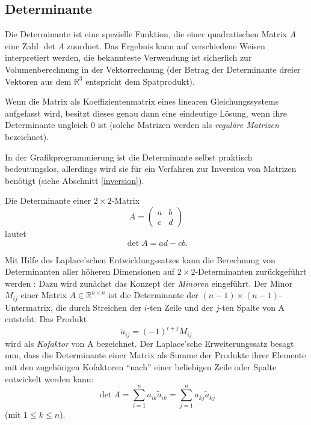 \subsection{Determinante}
Die Determinante ist eine spezielle Funktion, die einer quadratischen Matrix $A$ eine Zahl $\det A$ zuordnet. Das Ergebnis kann auf verschiedene Weisen interpretiert werden, die bekannteste Verwendung ist sicherlich zur Volumenberechnung in der Vektorrechnung (der Betrag der Determinante dreier Vektoren aus dem $\mathbb R^3$ entspricht dem Spatprodukt).

Wenn die Matrix als Koeffizientenmatrix eines linearen Gleichungssystems aufgefasst wird, besitzt dieses genau dann eine eindeutige Lösung, wenn ihre Determinante ungleich $0$ ist (solche Matrizen werden als \emph{reguläre Matrizen} bezeichnet). 

In der Grafikprogrammierung ist die Determinante selbst praktisch bedeutungslos, allerdings wird sie für ein Verfahren zur Inversion von Matrizen benötigt (siehe Abschnitt \ref{inversion}).

Die Determinante einer $2 \times 2$-Matrix
\begin{equation*}
 A = \begin{pmatrix}
      a & b \\
      c & d
     \end{pmatrix}
\end{equation*}
lautet
\begin{equation}
 \det A = ad - cb.
\end{equation}

Mit Hilfe des Laplace'schen Entwicklungssatzes kann die Berechnung von Determinanten aller höheren Dimensionen auf $2 \times 2$-Determinanten zurückgeführt werden : Dazu wird zunächst das Konzept der \emph{Minoren} eingeführt. Der Minor $M_{ij}$ einer Matrix $A \in \mathbb{R}^{n \times n}$ ist die Determinante der $(n-1) \times (n-1)$-Untermatrix, die durch Streichen der $i$-ten Zeile und der $j$-ten Spalte von A entsteht. Das Produkt
\begin{equation}
\label{cofactor}
 \tilde{a}_{ij} = (-1)^{i+j} M_{ij}
\end{equation}
wird als \emph{Kofaktor} von A bezeichnet. Der Laplace'sche Erweiterungssatz besagt nun, dass die Determinante einer Matrix als Summe der Produkte ihrer Elemente mit den zugehörigen Kofaktoren \enquote{nach} einer beliebigen Zeile oder Spalte entwickelt werden kann:
\begin{equation}
 \det A = \sum_{i=1}^n a_{ik} \tilde{a}_{ik} = \sum_{j=1}^n a_{kj} \tilde{a}_{kj}
\end{equation}
(mit $1 \leq k \leq n$).

